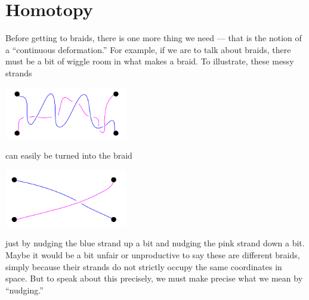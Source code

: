 \documentclass{amsart}
\begin{document}
\section{Homotopy}\label{homotopy-section}
Before getting to braids, there is one more thing we need --- that is the
notion of a ``continuous deformation.'' For example, if we are to talk about
braids, there must be a bit of wiggle room in what makes a braid. To
illustrate, these messy strands 
\begin{center} 
	\includegraphics[width = 0.4\textwidth]{Inkscape Files/messy-strands.png} 
\end{center}
can easily be turned into the braid 
\begin{center}
	\includegraphics[width = 0.4\textwidth]{Inkscape Files/unmessy-strands.png}
\end{center}
just by nudging the blue strand up a bit and nudging the pink
strand down a bit. Maybe it would be a bit unfair or unproductive to say these
are different braids, simply because their strands do not strictly occupy the
same coordinates in space. But to speak about this precisely, we must make
precise what we mean by ``nudging.'' 
\end{document}
